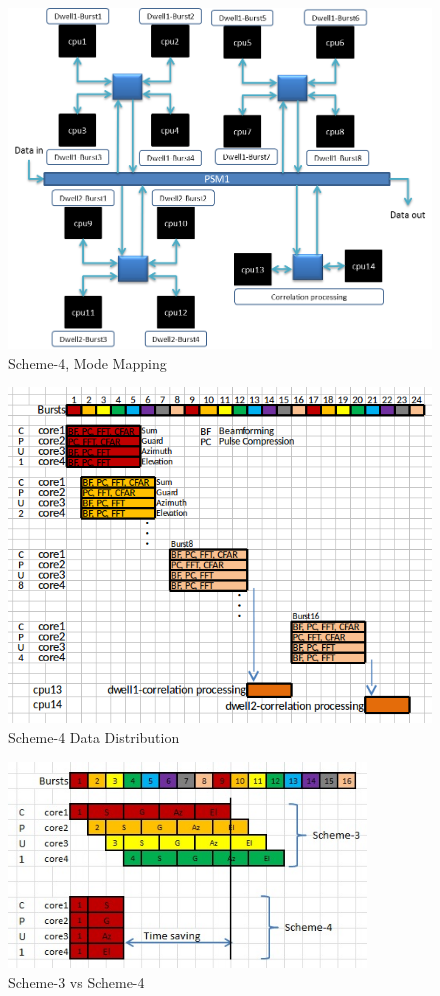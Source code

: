 \begin{figure}[h!]
	\centering
	\includegraphics[width=130mm]{figures/scheme5_mode_mapping}
	\caption{Scheme-4, Mode Mapping}
	\label{fig:mm:scheme5_mode_mapping}
\end{figure}

\begin{figure}[h!]
	\centering
	\includegraphics[width=130mm]{figures/scheme5_data_distri}
	\caption{Scheme-4 Data Distribution}
	\label{fig:mm:scheme5_data_distri}
\end{figure}

\begin{figure}[h!]
	\centering
	\includegraphics[width=95mm]{figures/scheme5_time_saving}
	\caption{Scheme-3 vs Scheme-4}
	\label{fig:mm:scheme5_time_saving}
\end{figure}


